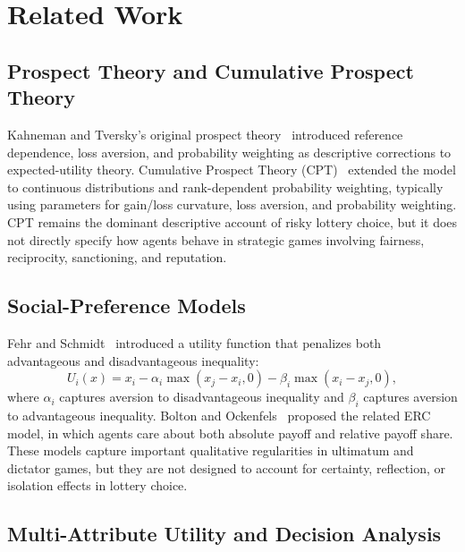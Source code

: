 \documentclass[journal]{IEEEtran}
\begin{document}
\section{Related Work}
\label{sec:related}

\subsection{Prospect Theory and Cumulative Prospect Theory}

Kahneman and Tversky's original prospect theory~\cite{kahneman1979} introduced reference dependence, loss aversion, and probability weighting as descriptive corrections to expected-utility theory.
Cumulative Prospect Theory (CPT)~\cite{tversky1992} extended the model to continuous distributions and rank-dependent probability weighting, typically using parameters for gain/loss curvature, loss aversion, and probability weighting.
CPT remains the dominant descriptive account of risky lottery choice, but it does not directly specify how agents behave in strategic games involving fairness, reciprocity, sanctioning, and reputation.

\subsection{Social-Preference Models}

Fehr and Schmidt~\cite{fehr1999} introduced a utility function that penalizes both advantageous and disadvantageous inequality:
\begin{equation}
    U_i(x) = x_i - \alpha_i \max(x_j - x_i, 0) - \beta_i \max(x_i - x_j, 0),
    \label{eq:fehr_schmidt}
\end{equation}
where $\alpha_i$ captures aversion to disadvantageous inequality and $\beta_i$ captures aversion to advantageous inequality.
Bolton and Ockenfels~\cite{bolton2000} proposed the related ERC model, in which agents care about both absolute payoff and relative payoff share.
These models capture important qualitative regularities in ultimatum and dictator games, but they are not designed to account for certainty, reflection, or isolation effects in lottery choice.

\subsection{Multi-Attribute Utility and Decision Analysis}
\end{document}
